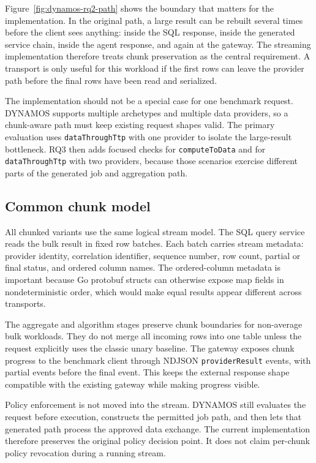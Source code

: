 Figure~\ref{fig:dynamos-rq2-path} shows the boundary that matters for the implementation. In the original path, a large result can be rebuilt several times before the client sees anything: inside the SQL response, inside the generated service chain, inside the agent response, and again at the gateway. The streaming implementation therefore treats chunk preservation as the central requirement. A transport is only useful for this workload if the first rows can leave the provider path before the final rows have been read and serialized.

The implementation should not be a special case for one benchmark request. DYNAMOS supports multiple archetypes and multiple data providers, so a chunk-aware path must keep existing request shapes valid. The primary evaluation uses \texttt{dataThroughTtp} with one provider to isolate the large-result bottleneck. RQ3 then adds focused checks for \texttt{computeToData} and for \texttt{dataThroughTtp} with two providers, because those scenarios exercise different parts of the generated job and aggregation path.

\subsection{Common chunk model}

All chunked variants use the same logical stream model. The SQL query service reads the bulk result in fixed row batches. Each batch carries stream metadata: provider identity, correlation identifier, sequence number, row count, partial or final status, and ordered column names. The ordered-column metadata is important because Go protobuf structs can otherwise expose map fields in nondeterministic order, which would make equal results appear different across transports.

The aggregate and algorithm stages preserve chunk boundaries for non-average bulk workloads. They do not merge all incoming rows into one table unless the request explicitly uses the classic unary baseline. The gateway exposes chunk progress to the benchmark client through NDJSON \texttt{providerResult} events, with partial events before the final event. This keeps the external response shape compatible with the existing gateway while making progress visible.

Policy enforcement is not moved into the stream. DYNAMOS still evaluates the request before execution, constructs the permitted job path, and then lets that generated path process the approved data exchange. The current implementation therefore preserves the original policy decision point. It does not claim per-chunk policy revocation during a running stream.

